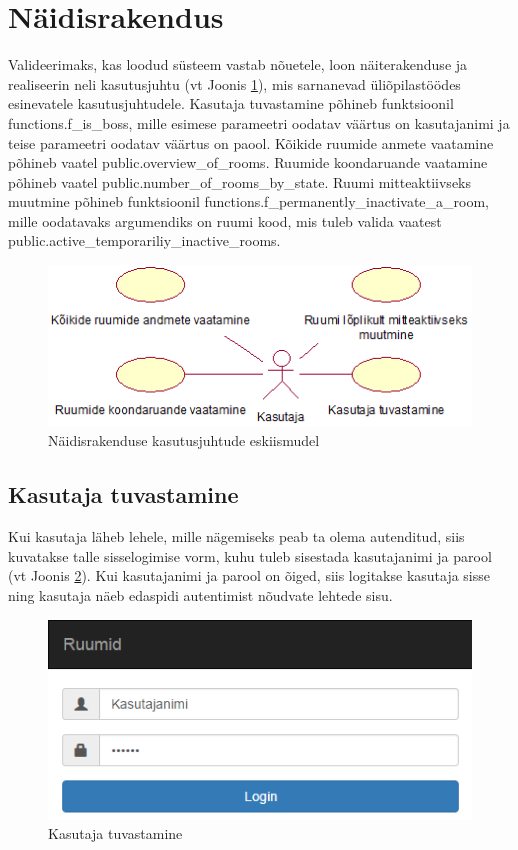 \documentclass[a4paper,12pt]{article} %
\begin{document}
\section{Näidisrakendus}
Valideerimaks, kas loodud süsteem vastab nõuetele, loon näiterakenduse ja realiseerin neli kasutusjuhtu (vt Joonis \ref{fig_näidisrakendus_kasutusjuhtude_eskiismudel}), mis sarnanevad üliõpilastöödes esinevatele kasutusjuhtudele. Kasutaja tuvastamine põhineb funktsioonil functions.f\_is\_boss, mille esimese parameetri oodatav väärtus on kasutajanimi ja teise parameetri oodatav väärtus on paool. Kõikide ruumide anmete vaatamine põhineb vaatel public.overview\_of\_rooms. Ruumide koondaruande vaatamine põhineb vaatel public.number\_of\_rooms\_by\_state. Ruumi mitteaktiivseks muutmine põhineb funktsioonil functions.f\_permanently\_inactivate\_a\_room, mille oodatavaks argumendiks on ruumi kood, mis tuleb valida vaatest public.active\_temporariliy\_inactive\_rooms.
\begin{figure}[H]
\begin{center}
\includegraphics[bb=0 0 430 164,scale=1]{./diagrams/sample-application-use-case-diagram.png}
\caption{Näidisrakenduse kasutusjuhtude eskiismudel}
\label{fig_näidisrakendus_kasutusjuhtude_eskiismudel}
\end{center}
\end{figure}
\subsection{Kasutaja tuvastamine}
Kui kasutaja läheb lehele, mille nägemiseks peab ta olema autenditud, siis kuvatakse talle sisselogimise vorm, kuhu tuleb sisestada kasutajanimi ja parool (vt Joonis \ref{fig_näidisrakendus_kasutaja_tuvastamine}). Kui kasutajanimi ja parool on õiged, siis logitakse kasutaja sisse ning kasutaja näeb edaspidi autentimist nõudvate lehtede sisu.
\begin{figure}[H]
\begin{center}
\includegraphics[bb=0 0 449 212,scale=1]{./diagrams/sample-app-user-auth.png}
\caption{Kasutaja tuvastamine}
\label{fig_näidisrakendus_kasutaja_tuvastamine}
\end{center}
\end{figure}
\end{document}
